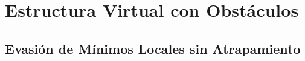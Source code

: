 \section{Estructura Virtual con Obstáculos}
\subsection{Evasión de Mínimos Locales sin Atrapamiento}
